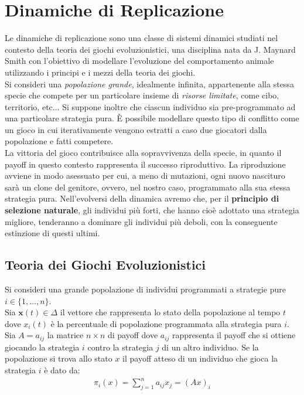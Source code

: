 \chapter{Dinamiche di Replicazione} %
\label{cha:dinamiche_di_replicazione}
Le dinamiche di replicazione sono una classe di sistemi dinamici studiati nel contesto della teoria dei giochi evoluzionistici, una disciplina nata da J. Maynard Smith con l’obiettivo di modellare l’evoluzione del comportamento animale utilizzando i principi e i mezzi della teoria dei giochi.\\

Si consideri una \emph{popolazione grande}, idealmente infinita, appartenente alla stessa specie che compete per un particolare insieme di \emph{risorse limitate}, come cibo, territorio, etc... Si suppone inoltre che ciascun individuo sia pre-programmato ad una particolare strategia pura. È possibile modellare questo tipo di conflitto come un gioco in cui iterativamente vengono estratti a caso due giocatori dalla popolazione e fatti competere.\\

La vittoria del gioco contribuisce alla sopravvivenza della specie, in quanto il payoff in questo contesto rappresenta il successo riproduttivo. La riproduzione avviene in modo asessuato per cui, a meno di mutazioni, ogni nuovo nascituro sarà un clone del genitore, ovvero, nel nostro caso, programmato alla sua stessa strategia pura. Nell’evolversi della dinamica avremo che, per il \textbf{principio di selezione naturale}, gli individui più forti, che hanno cioè adottato una strategia migliore, tenderanno a dominare gli individui più deboli, con la conseguente estinzione di questi ultimi.

\newpage

\section{Teoria dei Giochi Evoluzionistici} %
\label{sec:teoria_dei_giochi_evoluzionistici}
Si consideri una grande popolazione di individui programmati a strategie pure $i \in \{1, \dots, n\}$.\\

Sia $\mathbf{x}(t) \in \Delta$ il vettore che rappresenta lo stato della popolazione al tempo $t$ dove $x_i(t)$ è la percentuale di popolazione programmata alla strategia pura $i$. Sia $A=a_{ij}$ la matrice $n \times n$ di payoff dove $a_{ij}$ rappresenta il payoff che si ottiene giocando la strategia $i$ contro la strategia $j$ di un altro individuo. Se la popolazione si trova allo stato $x$ il payoff atteso di un individuo che gioca la strategia $i$ è dato da:
\begin{align}
	\pi_i (x) = \sum_{j=1}^n a_{ij} x_j = (Ax)_i
\end{align}


